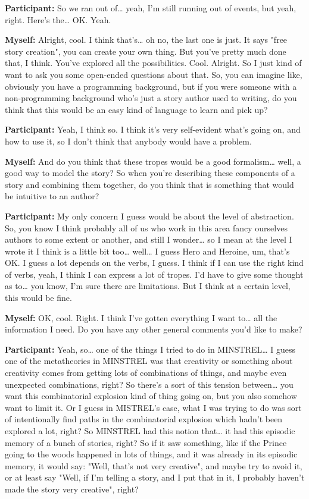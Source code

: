 \documentclass[11pt]{report}
\begin{document}
\begin{linenumbers}
\textbf{Participant:} So we ran out of\ldots{} yeah, I'm still running out of events, but yeah, right. Here's the\ldots{} OK. Yeah.

\textbf{Myself:} Alright, cool. I think that's\ldots{} oh no, the last one is just. It says "free story creation", you can create your own thing. But you've pretty much done that, I think. You've explored all the possibilities. Cool. Alright. So I just kind of want to ask you some open-ended questions about that. So, you can imagine like, obviously you have a programming background, but if you were someone with a non-programming background who's just a story author used to writing, do you think that this would be an easy kind of language to learn and pick up?

\textbf{Participant:} Yeah, I think so. I think it's very self-evident what's
going on, and how to use it, so I don't think that anybody would have a
problem.

\textbf{Myself:} And do you think that these tropes would be a good formalism\ldots{} well, a good way to model the story? So when you're describing these components of a story and combining them together, do you think that is something that would be intuitive to an author?

\textbf{Participant:} My only concern I guess would be about the level of abstraction. So, you know I think probably all of us who work in this area fancy ourselves authors to some extent or another, and still I wonder\ldots{} so I mean at the level I wrote it I think is a little bit too\ldots{} well\ldots{} I guess Hero and Heroine, um, that's OK. I guess a lot depends on the verbs, I guess. I think if I can use the right kind of verbs, yeah, I think I can express a lot of tropes. I'd have to give some thought as to\ldots{} you know, I'm sure there are limitations. But I think at a certain level, this would be fine.

\textbf{Myself:} OK, cool. Right. I think I've gotten everything I want to\ldots{} all the information I need. Do you have any other general comments you'd like to make?

\textbf{Participant:} Yeah, so\ldots{} one of the things I tried to do in MINSTREL\ldots{} I guess one of the metatheories in MINSTREL was that creativity or something about creativity comes from getting lots of combinations of things, and maybe even unexpected combinations, right? So there's a sort of this tension between\ldots{} you want this combinatorial explosion kind of thing going on, but you also somehow want to limit it. Or I guess in MISTREL's case, what I was trying to do was sort of intentionally find paths in the combinatorial explosion which hadn't been explored a lot, right? So MINSTREL had this notion that\ldots{} it had this episodic memory of a bunch of stories, right? So if it saw something, like if the Prince going to the woods happened in lots of things, and it was already in its episodic memory, it would say: "Well, that's not very creative", and maybe try to avoid it, or at least say "Well, if I'm telling a story, and I put that in it, I probably haven't made the story very creative", right?


\end{linenumbers}
\end{document}

